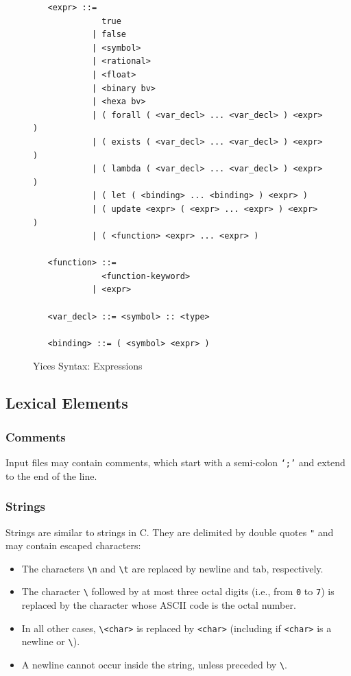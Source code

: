 \documentclass[11pt,twoside,fleqn,openright,titlepage]{cslreport}
\begin{document}
\begin{figure}
\begin{small}
\begin{verbatim}
   <expr> ::=
              true
            | false
            | <symbol>
            | <rational>
            | <float>
            | <binary bv>
            | <hexa bv>
            | ( forall ( <var_decl> ... <var_decl> ) <expr> )
            | ( exists ( <var_decl> ... <var_decl> ) <expr> )
            | ( lambda ( <var_decl> ... <var_decl> ) <expr> )
            | ( let ( <binding> ... <binding> ) <expr> )
            | ( update <expr> ( <expr> ... <expr> ) <expr> )
            | ( <function> <expr> ... <expr> )

   <function> ::=
              <function-keyword>
            | <expr>

   <var_decl> ::= <symbol> :: <type>

   <binding> ::= ( <symbol> <expr> )
\end{verbatim}
\end{small}
\caption{Yices Syntax: Expressions}
\label{syntax:expressions}
\end{figure}

\subsection{Lexical  Elements}

\subsubsection*{Comments}

Input  files  may contain  comments,  which  start  with a  semi-colon
\texttt{`;'} and extend to the end of the line.

\subsubsection*{Strings}

Strings  are similar to  strings in  C. They  are delimited  by double
quotes \texttt{"} and may contain escaped characters:
\begin{itemize}
\item     The     characters     \texttt{\textbackslash     n}     and
  \texttt{\textbackslash   t}  are  replaced   by  newline   and  tab,
  respectively.
\item The character \texttt{\textbackslash}  followed by at most three
  octal digits  (i.e., from \texttt{0}  to \texttt{7}) is  replaced by
  the character whose ASCII code is the octal number.
\item In  all other cases, \texttt{\textbackslash  <char>} is replaced
  by  \texttt{<char>} (including  if \texttt{<char>}  is a  newline or
  \texttt{\textbackslash}).
\item A  newline cannot  occur inside the  string, unless  preceded by
  \texttt{\textbackslash}.
\end{itemize}
\end{document}
